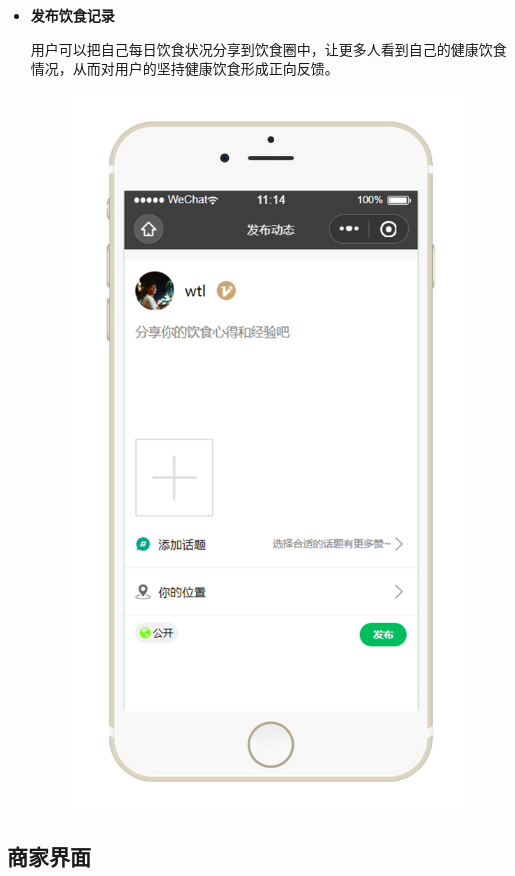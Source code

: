\documentclass[UTF8,12pt]{ctexart}
\numberwithin{figure}{section}%
\begin{document}
\begin{spacing}{2}
\begin{itemize}
	\item\textbf{发布饮食记录}
	
	用户可以把自己每日饮食状况分享到饮食圈中，让更多人看到自己的健康饮食情况，从而对用户的坚持健康饮食形成正向反馈。
	
	\newpage
	
	\begin{figure}[!htb]
		\centering
		\includegraphics[width=11cm]{fig/!5}
	\end{figure}
	
	
\end{itemize}


\subsection{商家界面}





\end{spacing}
\end{document}
